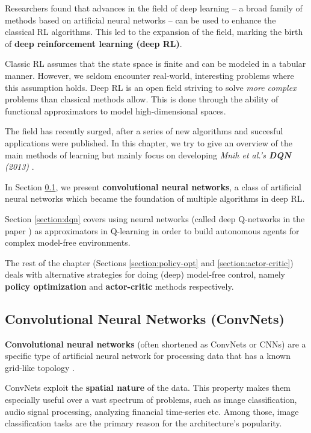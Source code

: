 Researchers found that advances in the field of deep learning -- a broad family of methods based on artificial neural networks -- can be used to enhance the classical RL algorithms.
This led to the expansion of the field, marking the birth of \textbf{deep reinforcement learning (deep RL)}.

Classic RL assumes that the state space is finite and can be modeled in a tabular manner.
However, we seldom encounter real-world, interesting problems where this assumption holds.
Deep RL is an open field striving to solve \emph{more complex} problems than classical methods allow.
This is done through the ability of functional approximators to model high-dimensional spaces.

The field has recently surged, after a series of new algorithms and succesful applications were published.
In this chapter, we try to give an overview of the main methods of learning but mainly focus on developing \emph{Mnih et al.'s \textbf{DQN} (2013)} \cite{atari-dqn}.

In Section \ref{section:convnets}, we present \textbf{convolutional neural networks}, a class of artificial neural networks which became the foundation of multiple algorithms in deep RL.

Section \ref{section:dqn} covers using neural networks (called deep Q-networks in the paper \cite{atari-dqn}) as approximators in Q-learning in order to build autonomous agents for complex model-free environments.

The rest of the chapter (Sections \ref{section:policy-opt} and \ref{section:actor-critic}) deals with alternative strategies for doing (deep) model-free control, namely \textbf{policy optimization} and \textbf{actor-critic} methods respectively.

\clearpage

\subsection{Convolutional Neural Networks (ConvNets)} \label{section:convnets}
\textbf{Convolutional neural networks} (often shortened as ConvNets or CNNs) are a specific type of artificial neural network for processing data that has a known grid-like topology \cite{Goodfellow-et-al-2016}.

ConvNets exploit the \textbf{spatial nature} of the data.
This property makes them especially useful over a vast spectrum of problems, such as image classification, audio signal processing, analyzing financial time-series etc.
Among those, image classification tasks are the primary reason for the architecture's popularity.

